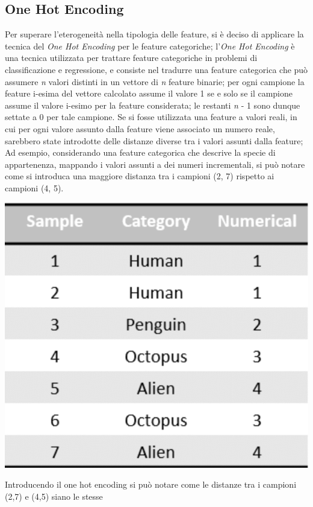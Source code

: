 \documentclass[a4paper,8pt]{article}
\newenvironment{Figure}
  {\par\medskip\noindent\minipage{\linewidth}}
  {\endminipage\par\medskip}
\begin{document}
\begin{multicols}{2}
\subsection{One Hot Encoding}
Per superare l'eterogeneità nella tipologia delle feature, si è deciso di applicare la tecnica del \emph{One Hot Encoding} \cite{OneHotEncoding} per le feature categoriche; l'\emph{One Hot Encoding} è una tecnica utilizzata per trattare feature categoriche in problemi di classificazione e regressione, e consiste nel tradurre una feature categorica che può assumere \emph{n} valori distinti in un vettore di \emph{n} feature binarie; per ogni campione la feature i-esima del vettore calcolato assume il valore 1 se e solo se il campione assume il valore i-esimo per la feature considerata; le restanti \emph{n }- 1 sono dunque settate a 0 per tale campione.
Se si fosse utilizzata una feature a valori reali, in cui per ogni valore assunto dalla feature viene associato un numero reale, sarebbero state introdotte delle distanze diverse tra i valori assunti dalla feature; Ad esempio, considerando una feature categorica che descrive la specie di appartenenza, mappando i valori assunti a dei numeri incrementali, si può notare come si introduca una maggiore distanza tra i campioni (2, 7) rispetto ai campioni (4, 5).
\begin{Figure}
 \centering
 \includegraphics[width=\linewidth]{categbw}
\end{Figure}
Introducendo il one hot encoding si può notare come le distanze tra i campioni (2,7) e (4,5) siano le stesse\\

\end{multicols}
\end{document}

